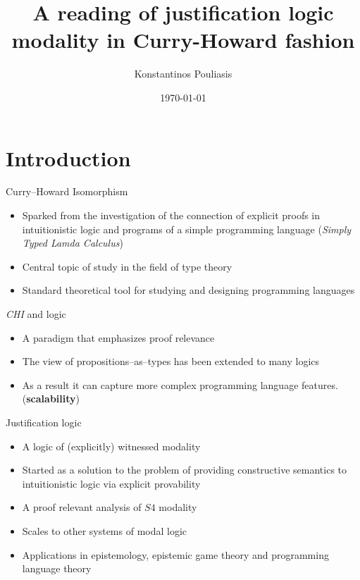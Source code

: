 \documentclass{beamer}
\title{A reading of justification logic modality in Curry-Howard fashion}
\date{\today}
\author{Konstantinos Pouliasis}
\institute{CUNY, Graduate Center}
\begin{document}
    \maketitle
    \section{Introduction}
    \begin{frame}{Curry--Howard Isomorphism}
      \begin{itemize}
\item[] Sparked from the investigation of the connection of 
explicit proofs in intuitionistic logic and 
programs of a simple programming language (\emph{Simply Typed Lamda Calculus})

\item[] Central topic of study in the field of type theory

\item[] Standard theoretical tool for studying and designing programming languages
      \end{itemize}
\end{frame}
\begin{frame}{\emph{CHI} and logic}
  \begin{itemize}

  \item[] A  paradigm that emphasizes proof relevance
  \item[] The view of propositions--as--types has been extended to many logics
  \item[] As a result it can capture more complex programming language features. 
   (\textbf{scalability})
  \end{itemize}
\end{frame}
\begin{frame}{Justification logic}
  \begin{itemize}
    \item[] A logic of (explicitly) witnessed modality
    \item[] Started as a solution to the problem  of providing 
    constructive semantics to intuitionistic logic via explicit provability
    \item [] A proof relevant analysis of $S4$ modality 
    \item[] Scales to other systems of modal logic
    \item[] Applications in epistemology, epistemic game theory and programming language theory
  \end{itemize}
\end{frame}
\end{document}

